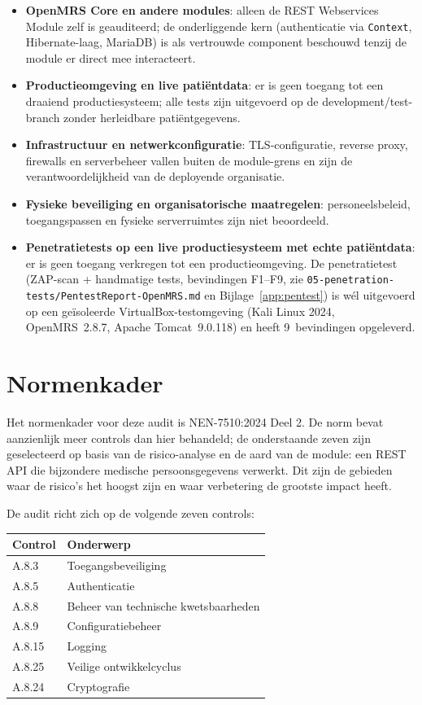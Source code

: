 \documentclass[12pt, a4paper]{report}
\begin{document}
\begin{itemize}
    \item \textbf{OpenMRS Core en andere modules}: alleen de REST
          Webservices Module zelf is geauditeerd; de onderliggende kern
          (authenticatie via \texttt{Context}, Hibernate-laag, MariaDB) is
          als vertrouwde component beschouwd tenzij de module er direct mee
          interacteert.
    \item \textbf{Productieomgeving en live patiëntdata}: er is geen
          toegang tot een draaiend productiesysteem; alle tests zijn
          uitgevoerd op de development/test-branch zonder herleidbare
          patiëntgegevens.
    \item \textbf{Infrastructuur en netwerkconfiguratie}: TLS-configuratie,
          reverse proxy, firewalls en serverbeheer vallen buiten de
          module-grens en zijn de verantwoordelijkheid van de deployende
          organisatie.
    \item \textbf{Fysieke beveiliging en organisatorische maatregelen}:
          personeelsbeleid, toegangspassen en fysieke serverruimtes zijn
          niet beoordeeld.
    \item \textbf{Penetratietests op een live productiesysteem met echte
          patiëntdata}: er is geen toegang verkregen tot een productieomgeving.
          De penetratietest (ZAP-scan + handmatige tests, bevindingen F1--F9, zie
          \texttt{05-penetration-tests/PentestReport-OpenMRS.md} en
          Bijlage~\ref{app:pentest}) is wél uitgevoerd op een geïsoleerde
          VirtualBox-testomgeving (Kali Linux 2024, OpenMRS~2.8.7,
          Apache Tomcat~9.0.118) en heeft 9~bevindingen opgeleverd.
\end{itemize}

\section{Normenkader}
\label{sec:normenkader}

Het normenkader voor deze audit is NEN-7510:2024 Deel 2. De norm bevat
aanzienlijk meer controls dan hier behandeld; de onderstaande zeven zijn
geselecteerd op basis van de risico-analyse en de aard van de module: een REST API die bijzondere medische persoonsgegevens verwerkt. Dit zijn
de gebieden waar de risico's het hoogst zijn en waar verbetering de
grootste impact heeft.

De audit richt zich op de volgende zeven controls:

\begin{tabular}{@{}ll}
    \toprule
    \textbf{Control} & \textbf{Onderwerp} \\
    \midrule
    A.8.3  & Toegangsbeveiliging \\
    A.8.5  & Authenticatie \\
    A.8.8  & Beheer van technische kwetsbaarheden \\
    A.8.9  & Configuratiebeheer \\
    A.8.15 & Logging \\
    A.8.25 & Veilige ontwikkelcyclus \\
    A.8.24 & Cryptografie \\
    \bottomrule
\end{tabular}
\end{document}
